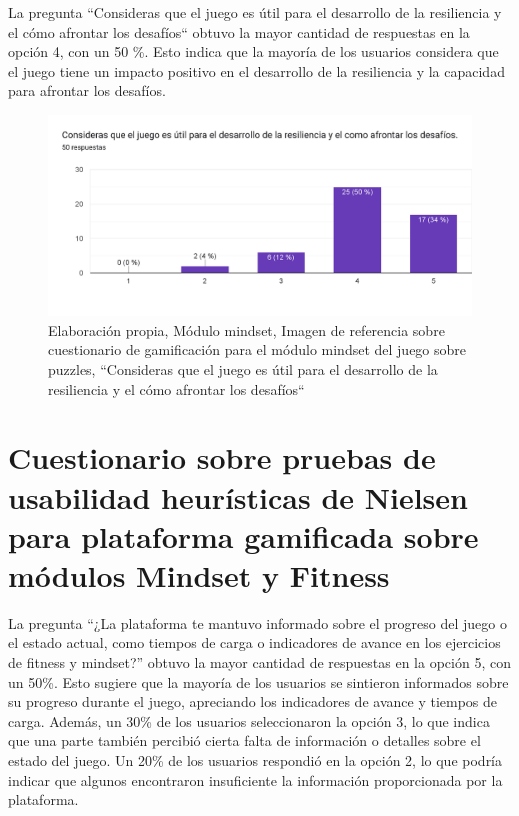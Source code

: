 La pregunta ``Consideras que el juego es útil para el desarrollo de la resiliencia y el cómo afrontar los desafíos`` obtuvo la mayor cantidad de respuestas en la opción 4, con un 50 \%. Esto indica que la mayoría de los usuarios considera que el juego tiene un impacto positivo en el desarrollo de la resiliencia y la capacidad para afrontar los desafíos.

\begin{figure}[H]
  \centering
  \includegraphics[width=0.7\linewidth]{Imagenes/mc11.png}
  \caption{Elaboración propia, Módulo mindset, Imagen de referencia sobre cuestionario de gamificación para el módulo mindset del juego sobre puzzles, ``Consideras que el juego es útil para el desarrollo de la resiliencia y el cómo afrontar los desafíos``}
  \label{fig:cuestionario11mindset}
\end{figure}


\section{Cuestionario sobre pruebas de usabilidad heurísticas de Nielsen para plataforma gamificada sobre módulos Mindset y Fitness}
La pregunta ``¿La plataforma te mantuvo informado sobre el progreso del juego o el estado actual, como tiempos de carga o indicadores de avance en los ejercicios de fitness y mindset?'' obtuvo la mayor cantidad de respuestas en la opción 5, con un 50\%. Esto sugiere que la mayoría de los usuarios se sintieron informados sobre su progreso durante el juego, apreciando los indicadores de avance y tiempos de carga. Además, un 30\% de los usuarios seleccionaron la opción 3, lo que indica que una parte también percibió cierta falta de información o detalles sobre el estado del juego. Un 20\% de los usuarios respondió en la opción 2, lo que podría indicar que algunos encontraron insuficiente la información proporcionada por la plataforma.

